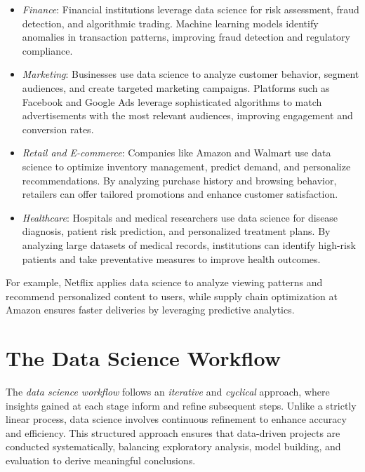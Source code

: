 \documentclass[
]{book}
\providecommand{\tightlist}{%
  \setlength{\itemsep}{0pt}\setlength{\parskip}{0pt}}
\theoremstyle{definition}
\theoremstyle{definition}
\theoremstyle{definition}
\theoremstyle{definition}
\theoremstyle{remark}
\begin{document}
\begin{itemize}
\tightlist
\item
  \emph{Finance}: Financial institutions leverage data science for risk assessment, fraud detection, and algorithmic trading. Machine learning models identify anomalies in transaction patterns, improving fraud detection and regulatory compliance.\\
\item
  \emph{Marketing}: Businesses use data science to analyze customer behavior, segment audiences, and create targeted marketing campaigns. Platforms such as Facebook and Google Ads leverage sophisticated algorithms to match advertisements with the most relevant audiences, improving engagement and conversion rates.\\
\item
  \emph{Retail and E-commerce}: Companies like Amazon and Walmart use data science to optimize inventory management, predict demand, and personalize recommendations. By analyzing purchase history and browsing behavior, retailers can offer tailored promotions and enhance customer satisfaction.\\
\item
  \emph{Healthcare}: Hospitals and medical researchers use data science for disease diagnosis, patient risk prediction, and personalized treatment plans. By analyzing large datasets of medical records, institutions can identify high-risk patients and take preventative measures to improve health outcomes.
\end{itemize}

For example, Netflix applies data science to analyze viewing patterns and recommend personalized content to users, while supply chain optimization at Amazon ensures faster deliveries by leveraging predictive analytics.

\section{The Data Science Workflow}\label{the-data-science-workflow-1}

The \emph{data science workflow} follows an \emph{iterative} and \emph{cyclical} approach, where insights gained at each stage inform and refine subsequent steps. Unlike a strictly linear process, data science involves continuous refinement to enhance accuracy and efficiency. This structured approach ensures that data-driven projects are conducted systematically, balancing exploratory analysis, model building, and evaluation to derive meaningful conclusions.
\end{document}
